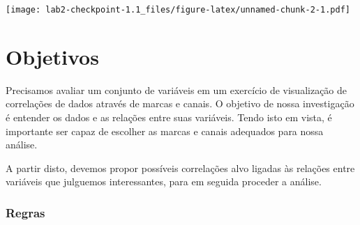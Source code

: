 \documentclass[]{article}
\newenvironment{Shaded}{\begin{snugshade}}{\end{snugshade}}
\newcommand{\KeywordTok}[1]{\textcolor[rgb]{0.13,0.29,0.53}{\textbf{#1}}}
\newcommand{\DataTypeTok}[1]{\textcolor[rgb]{0.13,0.29,0.53}{#1}}
\newcommand{\StringTok}[1]{\textcolor[rgb]{0.31,0.60,0.02}{#1}}
\newcommand{\OtherTok}[1]{\textcolor[rgb]{0.56,0.35,0.01}{#1}}
\newcommand{\OperatorTok}[1]{\textcolor[rgb]{0.81,0.36,0.00}{\textbf{#1}}}
\newcommand{\NormalTok}[1]{#1}
\begin{document}
\begin{Shaded}
\end{Shaded}

\texttt{[image: lab2-checkpoint-1.1\_files/figure-latex/unnamed-chunk-2-1.pdf]}

\section{Objetivos}\label{objetivos}

Precisamos avaliar um conjunto de variáveis em um exercício de
visualização de correlações de dados através de marcas e canais. O
objetivo de nossa investigação é entender os dados e as relações entre
suas variáveis. Tendo isto em vista, é importante ser capaz de escolher
as marcas e canais adequados para nossa análise.

A partir disto, devemos propor possíveis correlações alvo ligadas às
relações entre variáveis que julguemos interessantes, para em seguida
proceder a análise.

\subsubsection{Regras}\label{regras}
\end{document}
